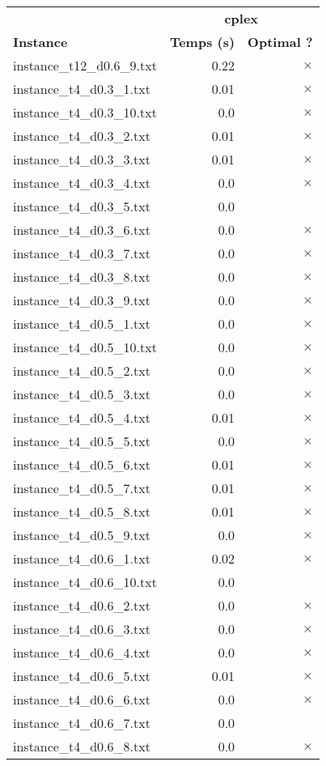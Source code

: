 \documentclass{article}
\begin{document}
\newpage
\begin{center}
\renewcommand{\arraystretch}{1.4}
 \begin{tabular}{lrr}
	\hline
 & \multicolumn{2}{c}{\textbf{cplex}}\\
\textbf{Instance}  & \textbf{Temps (s)} & \textbf{Optimal ?} \\\hline

instance\_t12\_d0.6\_9.txt & 0.22 & 
$\times$
\\
instance\_t4\_d0.3\_1.txt & 0.01 & 
$\times$
\\
instance\_t4\_d0.3\_10.txt & 0.0 & 
$\times$
\\
instance\_t4\_d0.3\_2.txt & 0.01 & 
$\times$
\\
instance\_t4\_d0.3\_3.txt & 0.01 & 
$\times$
\\
instance\_t4\_d0.3\_4.txt & 0.0 & 
$\times$
\\
instance\_t4\_d0.3\_5.txt & 0.0 & 
\\
instance\_t4\_d0.3\_6.txt & 0.0 & 
$\times$
\\
instance\_t4\_d0.3\_7.txt & 0.0 & 
$\times$
\\
instance\_t4\_d0.3\_8.txt & 0.0 & 
$\times$
\\
instance\_t4\_d0.3\_9.txt & 0.0 & 
$\times$
\\
instance\_t4\_d0.5\_1.txt & 0.0 & 
$\times$
\\
instance\_t4\_d0.5\_10.txt & 0.0 & 
$\times$
\\
instance\_t4\_d0.5\_2.txt & 0.0 & 
$\times$
\\
instance\_t4\_d0.5\_3.txt & 0.0 & 
$\times$
\\
instance\_t4\_d0.5\_4.txt & 0.01 & 
$\times$
\\
instance\_t4\_d0.5\_5.txt & 0.0 & 
$\times$
\\
instance\_t4\_d0.5\_6.txt & 0.01 & 
$\times$
\\
instance\_t4\_d0.5\_7.txt & 0.01 & 
$\times$
\\
instance\_t4\_d0.5\_8.txt & 0.01 & 
$\times$
\\
instance\_t4\_d0.5\_9.txt & 0.0 & 
$\times$
\\
instance\_t4\_d0.6\_1.txt & 0.02 & 
$\times$
\\
instance\_t4\_d0.6\_10.txt & 0.0 & 
\\
instance\_t4\_d0.6\_2.txt & 0.0 & 
$\times$
\\
instance\_t4\_d0.6\_3.txt & 0.0 & 
$\times$
\\
instance\_t4\_d0.6\_4.txt & 0.0 & 
$\times$
\\
instance\_t4\_d0.6\_5.txt & 0.01 & 
$\times$
\\
instance\_t4\_d0.6\_6.txt & 0.0 & 
$\times$
\\
instance\_t4\_d0.6\_7.txt & 0.0 & 
\\
instance\_t4\_d0.6\_8.txt & 0.0 & 
$\times$
\\
\hline\end{tabular}
\end{center}
\end{document}
